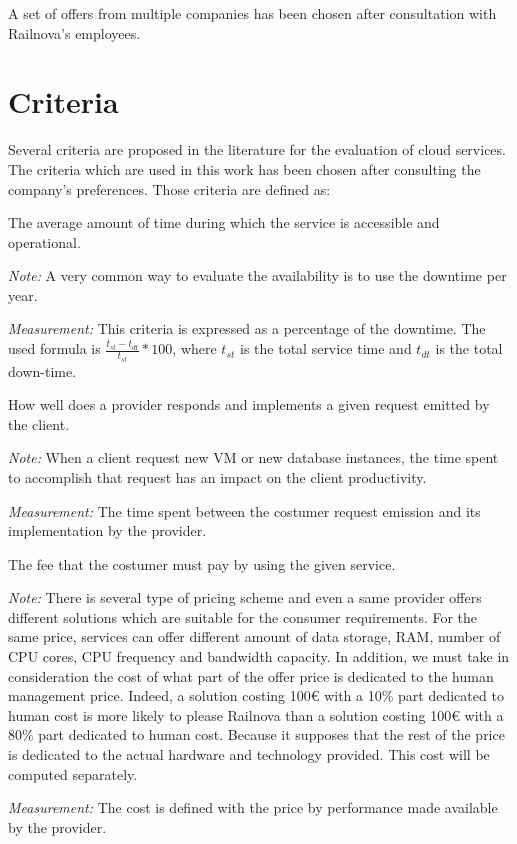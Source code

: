 \documentclass[a4paper,11pt]{article}
\begin{document}
A set of offers from multiple companies has been chosen after consultation with Railnova's employees.

\section{Criteria}
Several criteria are proposed in the literature for the evaluation of cloud services. The criteria which are used in this work has been chosen after consulting the company's preferences.
Those criteria are defined as:
\begin{description}[parsep=10pt,listparindent=\parindent,labelindent=\parindent,font=$\bullet$\ ]
  \item[Availability:] The average amount of time during which the service is accessible and operational.
    \par \emph{Note:} A very common way to evaluate the availability is to use the downtime per year.
    \par \emph{Measurement:} This criteria is expressed as a percentage of the downtime. The used formula is $\frac{t_{st}-t_{dt}}{t_{st}}*100$, where $t_{st}$ is the total service time and $t_{dt}$ is the total down-time.

  \item[Service efficiency:] How well does a provider responds and implements a given request emitted by the client.
     \par \emph{Note:} When a client request new VM or new database instances, the time spent to accomplish that request has an impact on the client productivity.
    \par \emph{Measurement:} The time spent between the costumer request emission and its implementation by the provider.

  \item[Cost:] The fee that the costumer must pay by using the given service.
    \par \emph{Note:} There is several type of pricing scheme and even a same provider offers different solutions which are suitable for the consumer requirements. For the same price, services can offer different amount of data storage, RAM, number of CPU cores, CPU frequency and bandwidth capacity. In addition, we must take in consideration the cost of what part of the offer price is dedicated to the human management price. Indeed, a solution costing 100\euro{} with a 10\% part dedicated to human cost is more likely to please Railnova than a solution costing 100\euro{} with a 80\% part dedicated to human cost. Because it supposes that the rest of the price is dedicated to the actual hardware and technology provided. This cost will be computed separately.
    \par \emph{Measurement:} The cost is defined with the price by performance made available by the provider.


\end{description}
\end{document}
